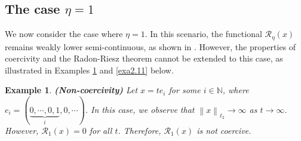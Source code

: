 \documentclass[a4paper,12pt]{article}
\newtheorem{example}[theorem]{Example}
\numberwithin{equation}{section}
\begin{document}


\subsection{The case $\eta=1$}\label{sec2.2}

\par We now consider the case where $\eta=1$. In this scenario, the functional $\mathcal{R}_{\eta}\left(x\right)$ remains weakly lower semi-continuous, as shown in \cite[Lemma 2.7, Remark 2.8]{LD25}. However, the properties of coercivity and the Radon-Riesz theorem cannot be extended to this case, as illustrated in Examples \ref{exa2.9} and \ref{exa2.11} below.

\begin{example}\label{exa2.9}
    \textbf{(Non-coercivity)} Let $x=te_{i}$ for some $i\in\mathbb{N}$, where $e_{i}=(\underbrace{0,\cdots,0,1}_{i},0,\cdots)$. In this case, we observe that $\left\|x\right\|_{\ell_{2}}\rightarrow\infty$ as $t\rightarrow\infty$. However, $\mathcal{R}_{1}\left(x\right)=0$ for all $t$. Therefore, $\mathcal{R}_{1}\left(x\right)$ is not coercive.
\end{example} 
\end{document}
